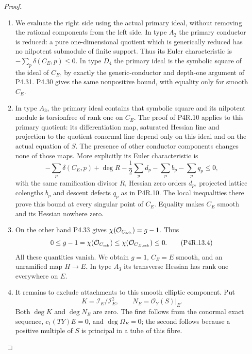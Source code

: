 \begin{proof}
\begin{enumerate}[label={$\langle1\rangle$\arabic*.},leftmargin=*]
\item We evaluate the right side using the actual primary
ideal, without removing the rational components from
the left side. In type $A_2$ the primary conductor
is reduced: a pure one-dimensional quotient which
is generically reduced has no nilpotent submodule
of finite support. Thus its Euler characteristic
is $-\sum_p\delta(C_E,p)\le0$. In type $D_4$ the
primary ideal is the symbolic square of the ideal
of $C_E$, by exactly the generic-conductor and
depth-one argument of P4.31. P4.30 gives the same
nonpositive bound, with equality only for smooth
$C_E$.

\item In type $A_3$, the primary ideal contains that
symbolic square and its nilpotent module is
torsionfree of rank one on $C_E$. The proof of
P4R.10 applies to this primary quotient: its
differentiation map, saturated Hessian line and
projection to the quotient conormal line depend
only on this ideal and on the actual equation of
$S$. The presence of other conductor components
changes none of those maps. More explicitly its
Euler characteristic is
\[
 -\sum_p\delta(C_E,p)+\deg R
 -\frac12\sum_p d_p-\sum_p b_p-\sum_p q_p\le0,
\]
with the same ramification divisor $R$, Hessian
zero orders $d_p$, projected lattice colengths
$b_p$ and descent defects $q_p$ as in P4R.10.
The local inequalities there prove this bound
at every singular point of $C_E$. Equality
makes $C_E$ smooth and its Hessian nowhere zero.

\item On the other hand P4.33 gives
$\chi(\mathcal O_{C_{\rm sch}})=g-1$. Thus
\[
 0\le g-1
 =\chi(\mathcal O_{C_{\rm sch}})
 \le\chi(\mathcal O_{C_{E,\rm sch}})\le0.                    \tag{P4R.13.4}
\]
All these quantities vanish. We obtain $g=1$,
$C_E=E$ smooth, and an unramified map $H\to E$.
In type $A_3$ its transverse Hessian has rank
one everywhere on $E$.

\item It remains to exclude attachments to this smooth
elliptic component. Put
\[
 K=\mathcal I_E/\mathcal I_E^2,
 \qquad N_E=\mathcal O_Y(S)|_E.
\]
Both $\deg K$ and $\deg N_E$ are zero. The first
follows from the conormal exact sequence,
$c_1(TY)E=0$, and $\deg\Omega_E=0$; the second
follows because a positive multiple of $S$ is
principal in a tube of this fibre.


\end{enumerate}
\end{proof}
